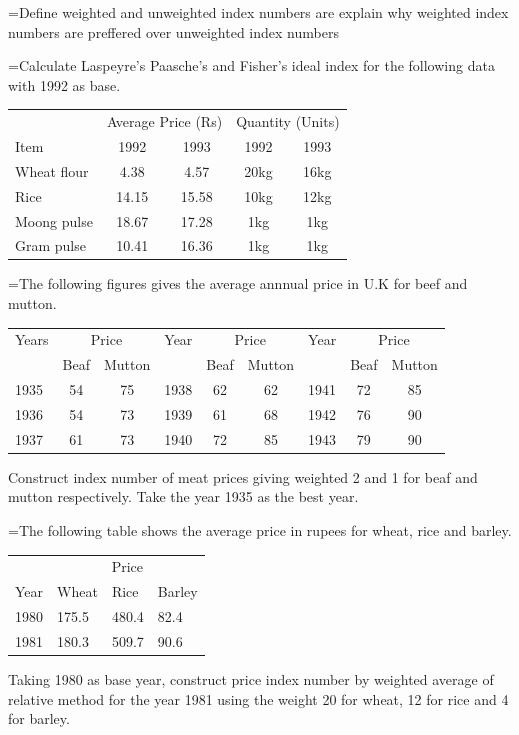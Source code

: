 \documentclass[11pt,a4paper]{article}
\newlength{\qw}
\newcommand{\q}[2]{%
  \Needspace{3\baselineskip}%
  \par\medskip\noindent\hangindent=\qw\hangafter=1\makebox[\qw][l]{\textbf{#1.}}#2\par}
\begin{document}
\q{132}{Define weighted and unweighted index numbers are explain why weighted index numbers are preffered over unweighted index numbers}
\q{133}{Calculate Laspeyre's Paasche's and Fisher's ideal index for the following data with 1992 as base.\par\smallskip
\begin{tabular}{|l|cc|cc|}\hline
 & \multicolumn{2}{c|}{Average Price (Rs)} & \multicolumn{2}{c|}{Quantity (Units)}\\
Item & 1992 & 1993 & 1992 & 1993\\
Wheat flour & 4.38 & 4.57 & 20kg & 16kg\\
Rice & 14.15 & 15.58 & 10kg & 12kg\\
Moong pulse & 18.67 & 17.28 & 1kg & 1kg\\
Gram pulse & 10.41 & 16.36 & 1kg & 1kg\\\hline
\end{tabular}}
\q{134}{The following figures gives the average annnual price in U.K for beef and mutton.\par\smallskip
\begin{tabular}{|l|cc|l|cc|l|cc|}\hline
Years & \multicolumn{2}{c|}{Price} & Year & \multicolumn{2}{c|}{Price} & Year & \multicolumn{2}{c|}{Price}\\
 & Beaf & Mutton & & Beaf & Mutton & & Beaf & Mutton\\
1935 & 54 & 75 & 1938 & 62 & 62 & 1941 & 72 & 85\\
1936 & 54 & 73 & 1939 & 61 & 68 & 1942 & 76 & 90\\
1937 & 61 & 73 & 1940 & 72 & 85 & 1943 & 79 & 90\\\hline
\end{tabular}\par\smallskip
Construct index number of meat prices giving weighted 2 and 1 for beaf and mutton respectively. Take the year 1935 as the best year.}
\q{135}{The following table shows the average price in rupees for wheat, rice and barley.\par\smallskip
\begin{tabular}{|l|l|l|l|}\hline
 & \multicolumn{3}{c|}{Price}\\
Year & Wheat & Rice & Barley\\
1980 & 175.5 & 480.4 & 82.4\\
1981 & 180.3 & 509.7 & 90.6\\\hline
\end{tabular}\par\smallskip
Taking 1980 as base year, construct price index number by weighted average of relative method for the year 1981 using the weight 20 for wheat, 12 for rice and 4 for barley.}
\end{document}
